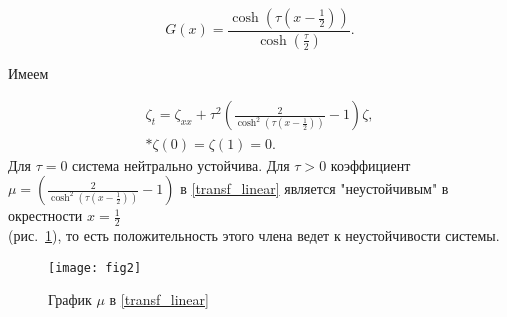 \begin{equation}
    G(x) = \frac{\cosh(\tau(x - \frac{1}{2}))}{\cosh(\frac{\tau}{2})}.
\end{equation} 

Имеем 

\begin{gather} \label{transf_linear}
    \zeta_t = \zeta_{xx} + \tau^2 \left( \frac{2}{\cosh^2(\tau(x -
    \frac{1}{2}))} - 1 \right) \zeta, \\* 
    \zeta(0) = \zeta(1) = 0.
\end{gather}
Для $\tau = 0$ система нейтрально устойчива. Для $\tau > 0$ коэффициент \\
$\mu = \left(\frac{2}{\cosh^2(\tau(x - \frac{1}{2}))} - 1 \right)$  в 
\eqref{transf_linear} является "неустойчивым" в окрестности 
$x = \frac{1}{2}$ \\(рис.~\ref{fig:fig06}), то есть положительность этого члена ведет к
неустойчивости системы.


\begin{figure}
    \centering
    \texttt{[image: fig2]}
    \caption{График $\mu$ в \eqref{transf_linear}}
    \label{fig:fig06}
\end{figure}
